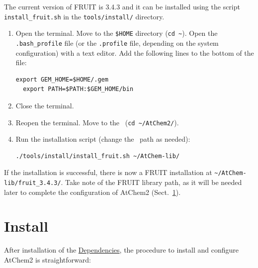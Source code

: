 The current version of FRUIT is 3.4.3 and it can be installed using the script
\texttt{install\_fruit.sh} in the \texttt{tools/install/} directory.

\begin{enumerate}
\item Open the terminal. Move to the \texttt{\$HOME} directory (\texttt{cd\ \textasciitilde}).
  Open the \texttt{.bash\_profile} file (or the \texttt{.profile} file, depending on the system
  configuration) with a text editor. Add the following lines to the bottom of the file:
  \begin{Verbatim}[fontsize=\small]
  export GEM_HOME=$HOME/.gem
  export PATH=$PATH:$GEM_HOME/bin
  \end{Verbatim}
\item Close the terminal.
\item Reopen the terminal. Move to the \maindir\ (\verb|cd ~/AtChem2/|).
\item Run the installation script (change the \depdir\ path as needed):
  \begin{Verbatim}[fontsize=\small]
  ./tools/install/install_fruit.sh ~/AtChem-lib/
  \end{Verbatim}
\end{enumerate}

If the installation is successful, there is now a FRUIT installation at
\texttt{\textasciitilde/AtChem-lib/fruit\_3.4.3/}. Take note of the FRUIT library path, as it
will be needed later to complete the configuration of AtChem2 (Sect.~\ref{sec:install}).

\section{Install} \label{sec:install}

After installation of the \hyperref[sec:dependencies]{Dependencies}, the procedure to install
and configure AtChem2 is straightforward:

